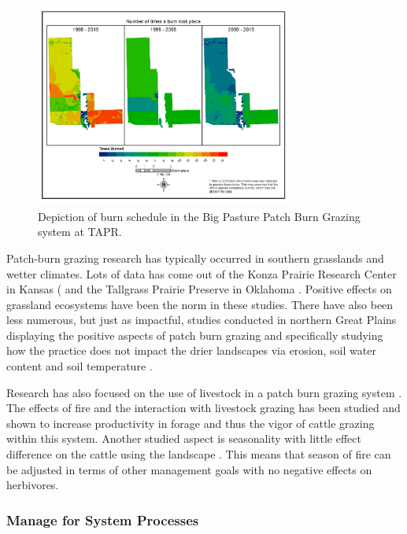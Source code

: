 \begin{figure}[th]
	\centering
	\includegraphics[width=0.75\textwidth]{figures/TAPR_Fire_mosaic.png}\caption[PBG at TAPR.]{Depiction of burn schedule in the Big Pasture Patch Burn Grazing
	system at TAPR.} \label{PBGatTAPR}
\end{figure}

Patch-burn grazing research has typically occurred in southern grasslands and wetter climates. 
Lots of data has come out of the Konza Prairie Research Center in Kansas (\citep{powell2006} and the
Tallgrass Prairie Preserve in Oklahoma \citep{fuhlendorf2009}.
Positive effects on grassland ecosystems have been the norm in these studies. 
There have also been less numerous, but just as impactful, studies conducted in northern Great Plains displaying the positive aspects of patch burn grazing and specifically studying how the practice does not impact the drier landscapes via erosion, soil water content and soil temperature \citep{vermeire2005}.

Research has also focused on the use of livestock in a patch burn grazing system  \citep{fuhlendorf2001, vermeire2004, toombs2010, scasta2016}. 
The effects of fire and the interaction with livestock grazing has been studied and shown to increase productivity in forage and thus the vigor of cattle grazing within this system. 
Another studied aspect is seasonality with little effect difference on the cattle using the landscape \citep{vermeire2004}. 
This means that season of fire can be adjusted in terms of other management goals with no negative effects on herbivores.

\hypertarget{manage-for-system-processes}{%
\subsubsection{Manage for System Processes}\label{manage-for-system-processes}}

